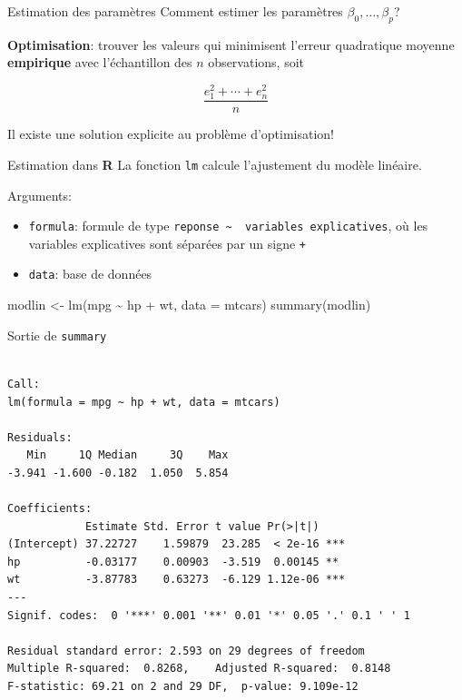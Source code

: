 \documentclass[
  ignorenonframetext,
]{beamer}
\newenvironment{Shaded}{\begin{snugshade}}{\end{snugshade}}
\newcommand{\AttributeTok}[1]{\textcolor[rgb]{0.40,0.45,0.13}{#1}}
\newcommand{\FunctionTok}[1]{\textcolor[rgb]{0.28,0.35,0.67}{#1}}
\newcommand{\NormalTok}[1]{\textcolor[rgb]{0.00,0.23,0.31}{#1}}
\newcommand{\OtherTok}[1]{\textcolor[rgb]{0.00,0.23,0.31}{#1}}
\newcommand{\SpecialCharTok}[1]{\textcolor[rgb]{0.37,0.37,0.37}{#1}}
\providecommand{\tightlist}{%
  \setlength{\itemsep}{0pt}\setlength{\parskip}{0pt}}\usepackage{longtable,booktabs,array}
\begin{document}
\begin{frame}{Estimation des paramètres}
\label{estimation-des-paramuxe8tres}
Comment estimer les paramètres \(\beta_0, \ldots, \beta_p\)?

\textbf{Optimisation}: trouver les valeurs qui minimisent l'erreur
quadratique moyenne \textbf{empirique} avec l'échantillon des \(n\)
observations, soit

\[\frac{e_1^2 + \cdots + e_n^2}{n}\]

Il existe une solution explicite au problème d'optimisation!
\end{frame}

\begin{frame}[fragile]{Estimation dans \textbf{R}}
\label{estimation-dans-r}
La fonction \texttt{lm} calcule l'ajustement du modèle linéaire.

Arguments:

\begin{itemize}
\tightlist
\item
  \texttt{formula}: formule de type
  \texttt{reponse\ \textasciitilde{}\ \ variables\ explicatives}, où les
  variables explicatives sont séparées par un signe \texttt{+}
\item
  \texttt{data}: base de données
\end{itemize}

\begin{Shaded}
\begin{Highlighting}[numbers=left,,]
\NormalTok{modlin }\OtherTok{\textless{}{-}} \FunctionTok{lm}\NormalTok{(mpg }\SpecialCharTok{\textasciitilde{}}\NormalTok{ hp }\SpecialCharTok{+}\NormalTok{ wt, }
             \AttributeTok{data =}\NormalTok{ mtcars)}
\FunctionTok{summary}\NormalTok{(modlin)}
\end{Highlighting}
\end{Shaded}
\end{frame}

\begin{frame}[fragile]{Sortie de \texttt{summary}}
\label{sortie-de-summary}
\footnotesize

\begin{verbatim}

Call:
lm(formula = mpg ~ hp + wt, data = mtcars)

Residuals:
   Min     1Q Median     3Q    Max 
-3.941 -1.600 -0.182  1.050  5.854 

Coefficients:
            Estimate Std. Error t value Pr(>|t|)    
(Intercept) 37.22727    1.59879  23.285  < 2e-16 ***
hp          -0.03177    0.00903  -3.519  0.00145 ** 
wt          -3.87783    0.63273  -6.129 1.12e-06 ***
---
Signif. codes:  0 '***' 0.001 '**' 0.01 '*' 0.05 '.' 0.1 ' ' 1

Residual standard error: 2.593 on 29 degrees of freedom
Multiple R-squared:  0.8268,    Adjusted R-squared:  0.8148 
F-statistic: 69.21 on 2 and 29 DF,  p-value: 9.109e-12
\end{verbatim}

\normalsize
\end{frame}
\end{document}
